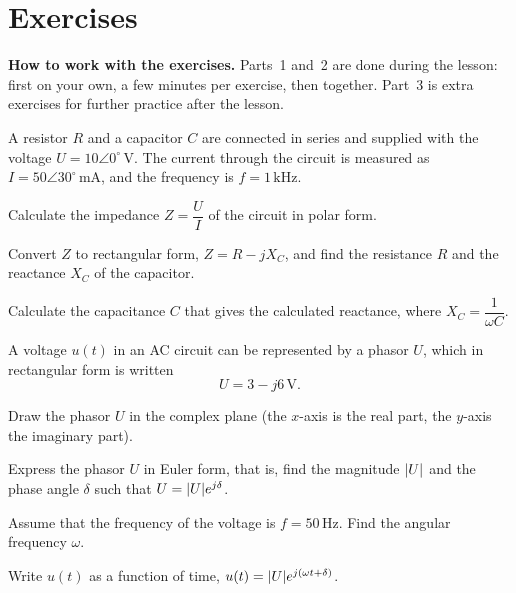 
\section{Exercises}
\label{c17:sec:uppgifter}

\begin{aside}
\textbf{How to work with the exercises.} Parts~1 and~2 are done during the lesson: first on your
own, a few minutes per exercise, then together. Part~3 is extra exercises for further practice
after the lesson.

\end{aside}


A resistor $R$ and a capacitor $C$ are connected in series and supplied with the voltage
$U = 10\angle 0^{\circ}\,\text{V}$. The current through the circuit is measured as
$I = 50\angle 30^{\circ}\,\text{mA}$, and the frequency is $f = 1\,\text{kHz}$.
\begin{parts}
  \item Calculate the impedance $Z = \dfrac{U}{I}$ of the circuit in polar form.
  \item Convert $Z$ to rectangular form, $Z = R - jX_C$, and find the resistance $R$ and the
    reactance $X_C$ of the capacitor.
  \item Calculate the capacitance $C$ that gives the calculated reactance, where
    $X_C = \dfrac{1}{\omega C}$.
\end{parts}

A voltage $u(t)$ in an AC circuit can be represented by a phasor $U$, which in rectangular form
is written
\[
  U = 3 - j6\,\text{V}.
\]
\begin{parts}
  \item Draw the phasor $U$ in the complex plane (the $x$-axis is the real part, the $y$-axis the
    imaginary part).
  \item Express the phasor $U$ in Euler form, that is, find the magnitude $\lvert U\rvert$ and the phase
    angle $\delta$ such that $U = \lvert U\rvert e^{j\delta}$.
  \item Assume that the frequency of the voltage is $f = 50\,\text{Hz}$. Find the angular
    frequency $\omega$.
  \item Write $u(t)$ as a function of time, $u(t) = \lvert U\rvert e^{j(\omega t + \delta)}$.
\end{parts}

